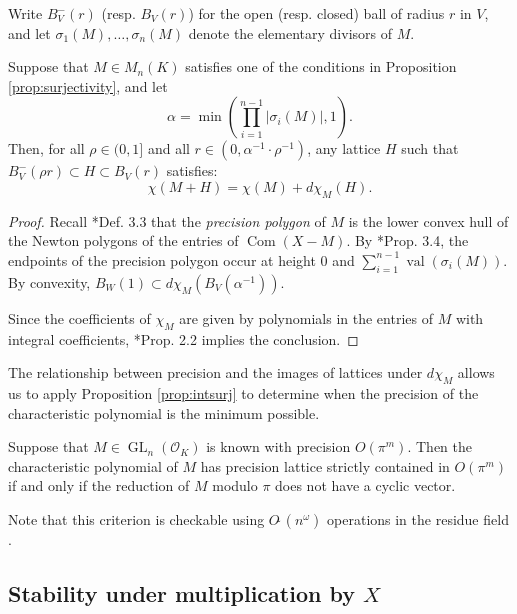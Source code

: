 \documentclass{sig-alternate-05-2015}
\DeclareMathOperator{\GL}{GL}
\DeclareMathOperator{\val}{val}
\DeclareMathOperator{\com}{Com}
\newcommand{\OK}{\mathcal{O}_K}
\newcommand{\softO}{O\tilde{~}}
\begin{document}
Write $B^-_V(r)$ (resp. $B_V(r)$) for the open (resp. closed) ball of radius $r$ in $V$, and let
$\sigma_1(M), \dots, \sigma_n(M)$ denote the elementary divisors of $M$.

\begin{prop} \label{prop:mainlem}
Suppose that $M \in M_n(K)$ satisfies one of the conditions in Proposition \ref{prop:surjectivity}, and let 
\[
\alpha = \min\left(\prod_{i=1}^{n-1} \left\vert \sigma_i(M) \right\vert, 1\right).
\]
Then, for all $\rho \in (0, 1]$ and all
$r \in (0, \alpha^{-1} \cdot \rho^{-1})$, any lattice $H$ such that $B_V^-(\rho r) \subset H \subset B_V(r)$
satisfies:
\begin{equation}
\chi(M + H) = \chi(M) + d\chi_M(H).
\end{equation}
\end{prop}

\begin{proof}

Recall \cite{caruso-roe-vaccon:15a}*{Def. 3.3} that the \emph{precision polygon}
of $M$ is the lower convex hull of the Newton polygons of the entries of $\com(X-M)$.
By \cite{caruso-roe-vaccon:15a}*{Prop. 3.4}, the endpoints of the precision polygon
occur at height $0$ and $\sum_{i=1}^{n-1} \val(\sigma_i(M))$.  By convexity,
$B_W(1) \subset d\chi_M(B_V(\alpha^{-1}))$.

Since the coefficients of $\chi_M$ are given by polynomials in the entries of $M$
with integral coefficients, \cite{caruso-roe-vaccon:15a}*{Prop. 2.2} implies
the conclusion.
\end{proof}

The relationship between precision and the images of lattices under $d\chi_M$ allows us to
apply Proposition \ref{prop:intsurj} to determine when the precision of the characteristic polynomial
is the minimum possible.

\begin{cor} \label{cor:prec_gain}
Suppose that $M \in \GL_n(\OK)$ is known with precision $O(\pi^m)$.
Then the characteristic polynomial of $M$ has precision lattice strictly contained in $O(\pi^m)$
if and only if the reduction of $M$ modulo $\pi$ does not have a cyclic vector.
\end{cor}

Note that this criterion is checkable using $\softO(n^\omega)$ operations in the residue field \cite{storjohann:01a}.

\subsection{Stability under multiplication by $X$}
\end{document}

